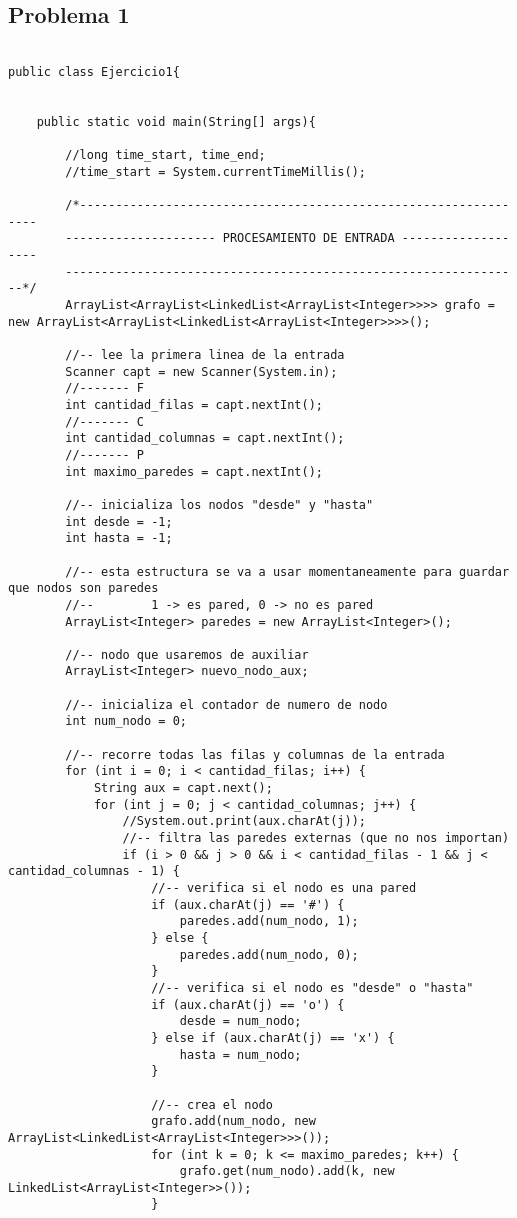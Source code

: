 \subsection{Problema 1}
	\begin{lstlisting}

public class Ejercicio1{


	public static void main(String[] args){

		//long time_start, time_end;
		//time_start = System.currentTimeMillis();

		/*----------------------------------------------------------------
		--------------------- PROCESAMIENTO DE ENTRADA -------------------
		----------------------------------------------------------------*/
		ArrayList<ArrayList<LinkedList<ArrayList<Integer>>>> grafo = new ArrayList<ArrayList<LinkedList<ArrayList<Integer>>>>();
		
		//-- lee la primera linea de la entrada
		Scanner capt = new Scanner(System.in);
		//------- F
		int cantidad_filas = capt.nextInt();
		//------- C
		int cantidad_columnas = capt.nextInt();
		//------- P
		int maximo_paredes = capt.nextInt();

		//-- inicializa los nodos "desde" y "hasta"
		int desde = -1;
		int hasta = -1;

		//-- esta estructura se va a usar momentaneamente para guardar que nodos son paredes
		//--		1 -> es pared, 0 -> no es pared
		ArrayList<Integer> paredes = new ArrayList<Integer>();

		//-- nodo que usaremos de auxiliar
		ArrayList<Integer> nuevo_nodo_aux;

		//-- inicializa el contador de numero de nodo
		int num_nodo = 0;
		
		//-- recorre todas las filas y columnas de la entrada
		for (int i = 0; i < cantidad_filas; i++) {
			String aux = capt.next();
			for (int j = 0; j < cantidad_columnas; j++) {
				//System.out.print(aux.charAt(j));
				//-- filtra las paredes externas (que no nos importan)
				if (i > 0 && j > 0 && i < cantidad_filas - 1 && j < cantidad_columnas - 1) {
					//-- verifica si el nodo es una pared
					if (aux.charAt(j) == '#') {
						paredes.add(num_nodo, 1);
					} else {
						paredes.add(num_nodo, 0);
					}
					//-- verifica si el nodo es "desde" o "hasta"
					if (aux.charAt(j) == 'o') {
						desde = num_nodo;
					} else if (aux.charAt(j) == 'x') {
						hasta = num_nodo;
					}

					//-- crea el nodo
					grafo.add(num_nodo, new ArrayList<LinkedList<ArrayList<Integer>>>());
					for (int k = 0; k <= maximo_paredes; k++) {
						grafo.get(num_nodo).add(k, new LinkedList<ArrayList<Integer>>());
					}


\end{lstlisting}
